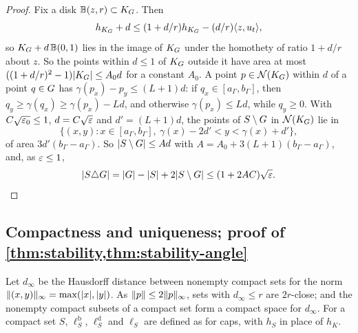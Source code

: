 \begin{proof}
Fix a disk $\mathbb B(z,r)\subset K_G$. Then
\[
  h_{K_G}+d\le(1+d/r)h_{K_G}-(d/r)\langle z,u_t\rangle,
\]
so $K_G+d\,\mathbb B(0,1)$ lies in the image of $K_G$ under the homothety of
ratio $1+d/r$ about $z$. So the points within $d\le1$ of $K_G$ outside it have
area at most $((1+d/r)^2-1)\lvert K_G\rvert\le A_0d$ for a constant $A_0$. A point
$p\in\mathcal{N}(K_G)$ within $d$ of a point $q\in G$ has
$\gamma(p_x)-p_y\le(L+1)d$: if $q_x\in[a_\Gamma,b_\Gamma]$, then
$q_y\ge\gamma(q_x)\ge\gamma(p_x)-Ld$, and otherwise $\gamma(p_x)\le Ld$, while
$q_y\ge0$. With $C\sqrt{\varepsilon_0}\le1$, $d=C\sqrt{\varepsilon}$ and $d'=(L+1)d$, the
points of $S\setminus G$ in $\mathcal{N}(K_G)$ lie in
\[
  \{(x,y):x\in[a_\Gamma,b_\Gamma],\ \gamma(x)-2d'<y<\gamma(x)+d'\},
\]
of area $3d'(b_\Gamma-a_\Gamma)$. So $\lvert S\setminus G\rvert\le Ad$ with
$A=A_0+3(L+1)(b_\Gamma-a_\Gamma)$, and, as $\varepsilon\le1$,
\[
  \lvert S\triangle G\rvert=\lvert G\rvert-\lvert S\rvert+2\lvert S\setminus G\rvert\le(1+2AC)\sqrt{\varepsilon}.
  \qedhere
\]
\end{proof}

\subsection{Compactness and uniqueness; proof of
\texorpdfstring{\cref{thm:stability,thm:stability-angle}}{the stability
theorems}}\label{sec:stab-entry}

Let $d_\infty$ be the Hausdorff distance between nonempty compact sets for the
norm $\lVert (x,y)\rVert_\infty=\max(\lvert x\rvert,\lvert y\rvert)$. As $\lVert p\rVert\le2\lVert p\rVert_\infty$,
sets with $d_\infty\le r$ are $2r$-close; and the nonempty compact subsets of a
compact set form a compact space for $d_\infty$. For a compact set $S$,
$\ell^{\mathrm b}_S$, $\ell^{\mathrm d}_S$ and $\ell_S$ are defined as for
caps, with $h_S$ in place of $h_K$.

